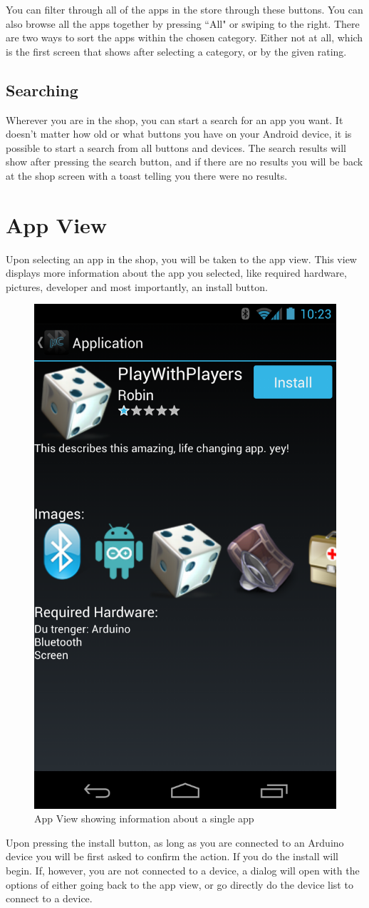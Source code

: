 		You can filter through all of the apps in the store through these buttons. You can also browse all the apps together by pressing ``All" or swiping to the right. There are two ways to sort the apps within the chosen category. Either not at all, which is the first screen that shows after selecting a category, or by the given rating.\\

		\subsection{Searching}
			Wherever you are in the shop, you can start a search for an app you want. It doesn't matter how old or what buttons you have on your Android device, it is possible to start a search from all buttons and devices. The search results will show after pressing the search button, and if there are no results you will be back at the shop screen with a toast telling you there were no results.
\newpage
	\section{App View}
	Upon selecting an app in the shop, you will be taken to the app view. This view displays more information about the app you selected, like required hardware, pictures, developer and most importantly, an install button. 
	\newline
	\begin{figure}[H]
		\centering
		\includegraphics[width=0.5 \textwidth]{images/Screenshots/app_view.png}
		\caption{App View showing information about a single app}
	\end{figure}
	Upon pressing the install button, as long as you are connected to an Arduino device you will be first asked to confirm the action. If you do the install will begin. If, however, you are not connected to a device, a dialog will open with the options of either going back to the app view, or go directly do the device list to connect to a device.

